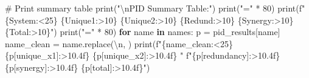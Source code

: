 \documentclass[
  11pt,
  letterpaper,
  oneside,
  openany]{book}
\newenvironment{Shaded}{\begin{snugshade}}{\end{snugshade}}
\newcommand{\BuiltInTok}[1]{\textcolor[rgb]{0.00,0.23,0.31}{#1}}
\newcommand{\CharTok}[1]{\textcolor[rgb]{0.13,0.47,0.30}{#1}}
\newcommand{\CommentTok}[1]{\textcolor[rgb]{0.37,0.37,0.37}{#1}}
\newcommand{\ControlFlowTok}[1]{\textcolor[rgb]{0.00,0.23,0.31}{\textbf{#1}}}
\newcommand{\DecValTok}[1]{\textcolor[rgb]{0.68,0.00,0.00}{#1}}
\newcommand{\KeywordTok}[1]{\textcolor[rgb]{0.00,0.23,0.31}{\textbf{#1}}}
\newcommand{\NormalTok}[1]{\textcolor[rgb]{0.00,0.23,0.31}{#1}}
\newcommand{\OperatorTok}[1]{\textcolor[rgb]{0.37,0.37,0.37}{#1}}
\newcommand{\SpecialCharTok}[1]{\textcolor[rgb]{0.37,0.37,0.37}{#1}}
\newcommand{\SpecialStringTok}[1]{\textcolor[rgb]{0.13,0.47,0.30}{#1}}
\newcommand{\StringTok}[1]{\textcolor[rgb]{0.13,0.47,0.30}{#1}}
\begin{document}
\begin{Shaded}
\begin{Highlighting}[]
    \CommentTok{\# Print summary table}
    \BuiltInTok{print}\NormalTok{(}\StringTok{"}\CharTok{\textbackslash{}n}\StringTok{PID Summary Table:"}\NormalTok{)}
    \BuiltInTok{print}\NormalTok{(}\StringTok{"="} \OperatorTok{*} \DecValTok{80}\NormalTok{)}
    \BuiltInTok{print}\NormalTok{(}\SpecialStringTok{f"}\SpecialCharTok{\{}\StringTok{\textquotesingle{}System\textquotesingle{}}\SpecialCharTok{:\textless{}25\}}\SpecialStringTok{ }\SpecialCharTok{\{}\StringTok{\textquotesingle{}Unique1\textquotesingle{}}\SpecialCharTok{:\textgreater{}10\}}\SpecialStringTok{ }\SpecialCharTok{\{}\StringTok{\textquotesingle{}Unique2\textquotesingle{}}\SpecialCharTok{:\textgreater{}10\}}\SpecialStringTok{ }\SpecialCharTok{\{}\StringTok{\textquotesingle{}Redund\textquotesingle{}}\SpecialCharTok{:\textgreater{}10\}}\SpecialStringTok{ }\SpecialCharTok{\{}\StringTok{\textquotesingle{}Synergy\textquotesingle{}}\SpecialCharTok{:\textgreater{}10\}}\SpecialStringTok{ }\SpecialCharTok{\{}\StringTok{\textquotesingle{}Total\textquotesingle{}}\SpecialCharTok{:\textgreater{}10\}}\SpecialStringTok{"}\NormalTok{)}
    \BuiltInTok{print}\NormalTok{(}\StringTok{"="} \OperatorTok{*} \DecValTok{80}\NormalTok{)}
    \ControlFlowTok{for}\NormalTok{ name }\KeywordTok{in}\NormalTok{ names:}
\NormalTok{        p }\OperatorTok{=}\NormalTok{ pid\_results[name]}
\NormalTok{        name\_clean }\OperatorTok{=}\NormalTok{ name.replace(}\StringTok{\textquotesingle{}}\CharTok{\textbackslash{}n}\StringTok{\textquotesingle{}}\NormalTok{, }\StringTok{\textquotesingle{} \textquotesingle{}}\NormalTok{)}
        \BuiltInTok{print}\NormalTok{(}\SpecialStringTok{f"}\SpecialCharTok{\{}\NormalTok{name\_clean}\SpecialCharTok{:\textless{}25\}}\SpecialStringTok{ }\SpecialCharTok{\{}\NormalTok{p[}\StringTok{\textquotesingle{}unique\_x1\textquotesingle{}}\NormalTok{]}\SpecialCharTok{:\textgreater{}10.4f\}}\SpecialStringTok{ }\SpecialCharTok{\{}\NormalTok{p[}\StringTok{\textquotesingle{}unique\_x2\textquotesingle{}}\NormalTok{]}\SpecialCharTok{:\textgreater{}10.4f\}}\SpecialStringTok{ "}
              \SpecialStringTok{f"}\SpecialCharTok{\{}\NormalTok{p[}\StringTok{\textquotesingle{}redundancy\textquotesingle{}}\NormalTok{]}\SpecialCharTok{:\textgreater{}10.4f\}}\SpecialStringTok{ }\SpecialCharTok{\{}\NormalTok{p[}\StringTok{\textquotesingle{}synergy\textquotesingle{}}\NormalTok{]}\SpecialCharTok{:\textgreater{}10.4f\}}\SpecialStringTok{ }\SpecialCharTok{\{}\NormalTok{p[}\StringTok{\textquotesingle{}total\textquotesingle{}}\NormalTok{]}\SpecialCharTok{:\textgreater{}10.4f\}}\SpecialStringTok{"}\NormalTok{)}
\end{Highlighting}
\end{Shaded}
\end{document}
